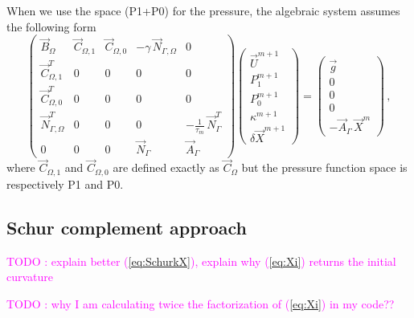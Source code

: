 \documentclass[a4paper,12pt,onecolumn]{article}
\newcommand{\NbulkT}{\vec{N}_{\Gamma,\Omega}^T}
\newcommand{\Nbulk}{\vec{N}_{\Gamma,\Omega}}
\begin{document}
When we use the space (P1+P0) for the pressure, the algebraic system assumes
the following form
\begin{equation}
\begin{pmatrix}
\vec B_\Omega & \vec C_{\Omega,1} & \vec C_{\Omega,0} & -\gamma\,\Nbulk & 0 \\
\vec C^T_{\Omega,1} & 0 & 0 & 0 & 0 \\
\vec C^T_{\Omega,0} & 0 & 0 & 0 & 0 \\
\NbulkT & 0 & 0 & 0 & -\frac1{\tau_m}\,\vec{N}_\Gamma^T \\
0 & 0 & 0 & \vec{N}_\Gamma & \vec{A}_\Gamma
\end{pmatrix}
\begin{pmatrix}
\vec U^{m+1} \\
P^{m+1}_1 \\
P^{m+1}_0 \\
\kappa^{m+1} \\
\delta\vec{X}^{m+1}
\end{pmatrix}
=
\begin{pmatrix}
\vec g \\
0 \\
0 \\
0 \\
-\vec{A}_\Gamma\,\vec{X}^{m}
\end{pmatrix} \,,
\label{eq:lin_p1p0}
\end{equation}
where $\vec C_{\Omega,1}$ and $\vec C_{\Omega,0}$ are defined exactly as $\vec
C_\Omega$ but the pressure function space is respectively P1 and P0.

\subsection{Schur complement approach}\label{sec:shur}

\textcolor{magenta}{TODO : explain better (\ref{eq:SchurkX}), explain why
(\ref{eq:Xi}) returns the initial curvature}

\textcolor{magenta}{TODO : why I am calculating twice the factorization of
(\ref{eq:Xi}) in my code??}
\end{document}
